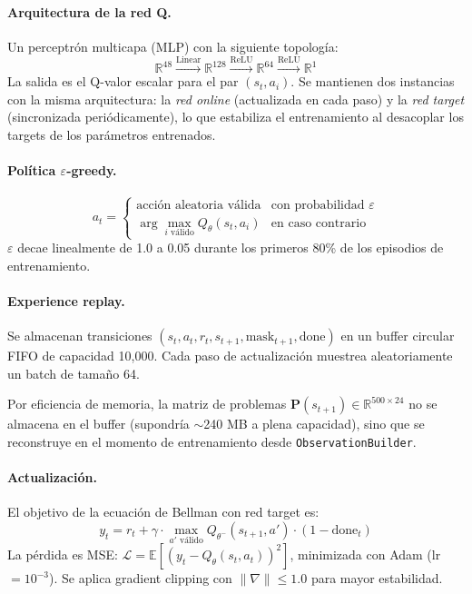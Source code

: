 \documentclass[12pt, a4paper]{article}
\begin{document}
\paragraph{Arquitectura de la red Q.}
Un perceptrón multicapa (MLP) con la siguiente topología:
\[
  \mathbb{R}^{48} \xrightarrow{\text{Linear}} \mathbb{R}^{128} \xrightarrow{\text{ReLU}}
  \mathbb{R}^{64} \xrightarrow{\text{ReLU}} \mathbb{R}^{1}
\]
La salida es el Q-valor escalar para el par $(s_t, a_i)$. Se mantienen dos
instancias con la misma arquitectura: la \textit{red online} (actualizada en
cada paso) y la \textit{red target} (sincronizada periódicamente), lo que
estabiliza el entrenamiento al desacoplar los targets de los parámetros
entrenados.

\paragraph{Política $\varepsilon$-greedy.}
\[
  a_t = \begin{cases}
    \text{acción aleatoria válida} & \text{con probabilidad } \varepsilon \\
    \arg\max_{i \text{ válido}} Q_\theta(s_t, a_i) & \text{en caso contrario}
  \end{cases}
\]
$\varepsilon$ decae linealmente de 1.0 a 0.05 durante los primeros 80\% de los
episodios de entrenamiento.

\paragraph{Experience replay.}
Se almacenan transiciones $(s_t, a_t, r_t, s_{t+1}, \text{mask}_{t+1}, \text{done})$
en un buffer circular FIFO de capacidad 10,000. Cada paso de actualización
muestrea aleatoriamente un batch de tamaño 64.

Por eficiencia de memoria, la matriz de problemas
$\mathbf{P}(s_{t+1}) \in \mathbb{R}^{500 \times 24}$ no se almacena en el buffer
(supondría $\sim$240 MB a plena capacidad), sino que se reconstruye en el momento
de entrenamiento desde \texttt{ObservationBuilder}.

\paragraph{Actualización.}
El objetivo de la ecuación de Bellman con red target es:
\[
  y_t = r_t + \gamma \cdot \max_{a' \text{ válido}} Q_{\theta^-}(s_{t+1}, a')
  \cdot (1 - \text{done}_t)
\]
La pérdida es MSE: $\mathcal{L} = \mathbb{E}\left[(y_t - Q_\theta(s_t, a_t))^2\right]$,
minimizada con Adam (lr $= 10^{-3}$). Se aplica gradient clipping con
$\|\nabla\| \leq 1.0$ para mayor estabilidad.
\end{document}

